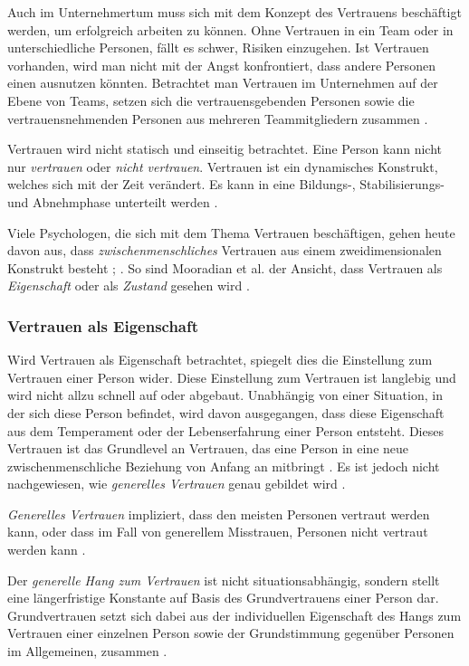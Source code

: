 \documentclass[a4paper,11pt]{article}%
\renewcommand{\\}{\vspace*{0.5\baselineskip} \newline}
\begin{document}
Auch im Unternehmertum muss sich mit dem Konzept des Vertrauens beschäftigt werden, um erfolgreich arbeiten zu können. Ohne Vertrauen in ein Team oder in unterschiedliche Personen, fällt es schwer, Risiken einzugehen. Ist Vertrauen vorhanden, wird man nicht mit der Angst konfrontiert, dass andere Personen einen ausnutzen könnten. Betrachtet man Vertrauen im Unternehmen auf der Ebene von Teams, setzen sich die vertrauensgebenden Personen sowie die vertrauensnehmenden Personen aus mehreren Teammitgliedern zusammen \citep[S. 1152]{breuer2016does}.

Vertrauen wird nicht statisch und einseitig betrachtet. Eine Person kann nicht nur \textit{vertrauen} oder \textit{nicht vertrauen}. Vertrauen ist ein dynamisches Konstrukt, welches sich mit der Zeit verändert. Es kann in eine Bildungs-, Stabilisierungs- und Abnehmphase unterteilt werden \citep[S. 396]{rousseau1998not}.

Viele Psychologen, die sich mit dem Thema Vertrauen beschäftigen, gehen heute davon aus, dass \textit{zwischenmenschliches} Vertrauen aus einem zweidimensionalen Konstrukt besteht \citep{johnson2005cognitive}; \citep{cook1980new}. So sind Mooradian et al. der Ansicht, dass Vertrauen als \textit{Eigenschaft} oder als \textit{Zustand} gesehen wird \citep[S. 524-525]{mooradian2006trusts}.

\subsubsection{Vertrauen als Eigenschaft }
\label{Vertrauen als Eigenschaft}
Wird Vertrauen als Eigenschaft betrachtet, spiegelt dies die Einstellung zum Vertrauen einer Person wider. Diese Einstellung zum Vertrauen ist langlebig und wird nicht allzu schnell auf oder abgebaut. Unabhängig von einer Situation, in der sich diese Person befindet, wird davon ausgegangen, dass diese Eigenschaft aus dem Temperament oder der Lebenserfahrung einer Person entsteht. Dieses Vertrauen ist das Grundlevel an Vertrauen, das eine Person in eine neue zwischenmenschliche Beziehung von Anfang an mitbringt \citep[S. 11]{couch1996assessment}. Es ist jedoch nicht nachgewiesen, wie \textit{generelles Vertrauen} genau gebildet wird \citep[S. 409]{stolle2002trusting}.

\textit{Generelles Vertrauen} impliziert, dass den meisten Personen vertraut werden kann, oder dass im Fall von generellem Misstrauen, Personen nicht vertraut werden kann \citep[S. 409]{stolle2002trusting}.

Der \textit{generelle Hang zum Vertrauen} ist nicht situationsabhängig, sondern stellt eine längerfristige Konstante auf Basis des Grundvertrauens einer Person dar. Grundvertrauen setzt sich dabei aus der individuellen Eigenschaft des Hangs zum Vertrauen einer einzelnen Person sowie der Grundstimmung gegenüber Personen im Allgemeinen, zusammen \citep[S. 11]{couch1996assessment}.
\end{document}
